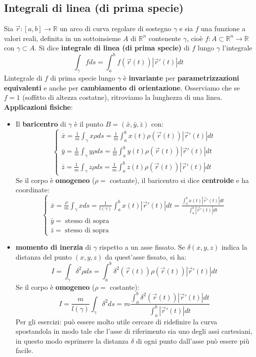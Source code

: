 \subsection{Integrali di linea (di prima specie)}
Sia $\vec{r}: [a,b] \rightarrow \mathbb{R}$ un arco di curva regolare di sostegno $\gamma$ e sia $f$ una funzione a valori reali, definita in un sottoinsieme $A$ di $\mathbb{R}^n$ contenente $\gamma$, cioè $f:A\subset \mathbb{R}^n \rightarrow \mathbb{R}$ con $\gamma \subset A$.\newline
\newline
Si dice \textbf{integrale di linea (di prima specie)} di $f$ lungo $\gamma$ l'integrale
\[
    \int_{\gamma} f ds = \int_{a}^{b}f(\vec{r}(t))|\vec{r}'(t)|dt
\]
Lintegrale di $f$ di prima specie lungo $\gamma$ è \textbf{invariante} per \textbf{parametrizzazioni equivalenti} e anche per \textbf{cambiamento di orientazione}.\newline
\newline
Osserviamo che se $f = 1$ (soffitto di altezza costatne), ritroviamo la lunghezza di una linea.
\textbf{Applicazioni fisiche}:
\begin{itemize}
    \item Il \textbf{baricentro} di $\gamma$ è il punto $B = (\bar{x},\bar{y},\bar{z})$ con:
    \[
        \begin{cases}
            \bar{x} = \frac{1}{m}\int_\gamma x\rho ds = \frac{1}{m}\int_{a}^{b}x(t)\rho(\vec{r}(t))|\vec{r}'(t)|dt\\
            \bar{y} = \frac{1}{m}\int_\gamma y\rho ds = \frac{1}{m}\int_{a}^{b}y(t)\rho(\vec{r}(t))|\vec{r}'(t)|dt\\
            \bar{z} = \frac{1}{m}\int_\gamma z\rho ds = \frac{1}{m}\int_{a}^{b}z(t)\rho(\vec{r}(t))|\vec{r}'(t)|dt
        \end{cases}
    \]
    Se il corpo è \textbf{omogeneo} ($\rho =$ costante), il baricentro si dice \textbf{centroide} e ha coordinate:
    \[
        \begin{cases}
            \bar{x} = \frac{\rho}{m}\int_\gamma x ds = \frac{1}{l(\gamma)}\int_{a}^{b}x(t)|\vec{r}'(t)|dt = \frac{\int_{a}^{b}x(t)|\vec{r}'(t)|dt}{\int_{a}^{b}|\vec{r}'(t)|dt}\\
            \bar{y} = \;\text{stesso di sopra}\\   
            \bar{z} = \;\text{stesso di sopra}
        \end{cases}
    \]
    \item \textbf{momento di inerzia} di $\gamma$ rispetto a un asse fissato. Se $\delta(x,y,z)$ indica la distanza del punto $(x,y,z)$ da quest'asse fissato, si ha:
    \[
        I = \int_\gamma \delta^2 \rho ds = \int_{a}^{b}\delta^2(\vec{r}(t))\rho(\vec{r}(t))|\vec{r}'(t)|dt
    \]
    Se il corpo è \textbf{omogeneo} ($\rho =$ costante):
    \[
        I = \frac{m}{l(\gamma)}\int_\gamma \delta^2ds = m \frac{\int_{a}^{b}\delta^2(\vec{r}(t))|\vec{r}'(t)|dt}{\int_{a}^{b}|\vec{r}'(t)|dt}
    \]
    Per gli esercizi: può essere molto utile cercare di ridefinire la curva spostandola in modo tale che l'asse di riferimento sia uno degli assi cartesiani, in questo modo esprimere la distanza $\delta$ di ogni punto dall'asse può essere più facile.
\end{itemize}
